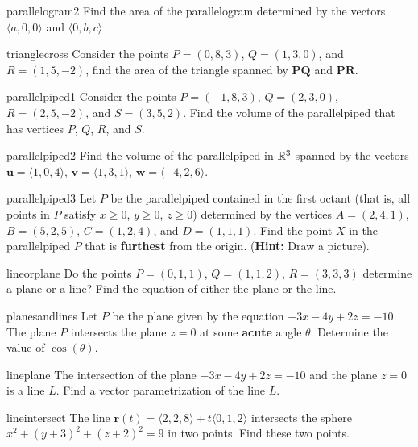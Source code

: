 \begin{problem}{parallelogram2}
    Find the area of the parallelogram determined by the vectors $\langle a, 0, 0\rangle$ and $\langle 0, b, c\rangle$
\end{problem}

\begin{problem}{trianglecross}
    Consider the points $P= (0,8,3)$, $Q= (1,3,0)$, and $R= (1,5,-2)$, find the area of the triangle spanned by   $\bm{PQ}$ and  $\bm{PR}$.
\end{problem}

\begin{problem}{parallelpiped1}
    Consider the points $P= (-1,8,3)$, $Q= (2,3,0)$, $R= (2,5,-2)$, and $S = (3,5,2)$. Find the volume of the parallelpiped that has vertices $P$, $Q$, $R$, and $S$.
    
\end{problem}

\begin{problem}{parallelpiped2}
    Find the volume of the parallelpiped in $\mathbb{R}^3$ spanned by the vectors $\bm{u} =\langle 1, 0,4 \rangle$, $\bm{v} = \langle 1, 3, 1 \rangle$, $\bm{w} = \langle -4, 2, 6 \rangle$.
\end{problem}

\begin{problem}{parallelpiped3}
    Let $P$ be the parallelpiped contained in the first octant (that is, all points in $P$ satisfy $x \geq 0$, $y \geq 0$, $z \geq 0$) determined by the vertices $A= (2,4,1)$, $B= (5,2,5)$, $C= (1,2,4)$, and $D = (1,1,1)$. Find the point $X$ in the parallelpiped $P$ that is \textbf{furthest} from the origin. (\textbf{Hint:} Draw a picture).
\end{problem}

\begin{problem}{lineorplane}
    Do the points $P = (0,1,1)$, $Q = (1,1,2)$, $R = (3,3,3)$ determine a plane or a line?  Find the equation of either the plane or the line.
\end{problem}

\begin{problem}{planesandlines}
    Let $P$ be the plane given by the equation $-3x - 4y+2z = -10$. The plane $P$ intersects the plane $z=0$ at some \textbf{acute} angle $\theta$.  Determine the value of $\cos(\theta)$.
\end{problem}

\begin{problem}{lineplane}
    The intersection of the plane $-3x - 4y+2z = -10$ and the plane $z=0$ is a line $L$.  Find a vector parametrization of the line $L$.
\end{problem}

\begin{problem}{lineintersect}
    The line $\bm{r}(t) = \langle 2, 2, 8 \rangle + t\langle 0,1,2\rangle$ intersects the sphere $x^2 + (y+3)^2 + (z+2)^2 = 9$ in two points.  Find these two points.
\end{problem}
